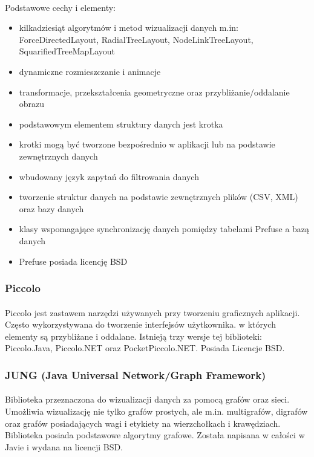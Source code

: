 \documentclass[a4paper,10pt]{article}
\begin{document}
\paragraph{}Podstawowe cechy i elementy:
\begin{itemize}
\item kilkadziesiąt algorytmów i metod wizualizacji danych m.in: ForceDirectedLayout, RadialTreeLayout, NodeLinkTreeLayout, SquarifiedTreeMapLayout
\item dynamiczne rozmieszczanie i animacje
\item transformacje, przekształcenia geometryczne oraz przybliżanie/oddalanie obrazu
\item podstawowym elementem struktury danych jest krotka
\item krotki mogą być tworzone bezpośrednio w aplikacji lub na podstawie zewnętrznych danych
\item wbudowany język zapytań do filtrowania danych
\item tworzenie struktur danych na podstawie zewnętrznych plików (CSV, XML) oraz bazy danych
\item klasy wspomagające synchronizację danych pomiędzy tabelami Prefuse a bazą danych
\item Prefuse posiada licencję BSD
\end{itemize}

\subsubsection{Piccolo}
\paragraph{} Piccolo jest zastawem narzędzi używanych przy tworzeniu graficznych aplikacji. Często wykorzystywana do tworzenie interfejsów użytkownika. w których elementy są przybliżane i oddalane. Istnieją trzy wersje tej biblioteki: Piccolo.Java, Piccolo.NET oraz PocketPiccolo.NET. Posiada Licencje BSD.

\subsubsection{JUNG (Java Universal Network/Graph Framework)}
\paragraph{} Biblioteka przeznaczona do wizualizacji danych za pomocą grafów oraz sieci. Umożliwia wizualizację nie tylko grafów prostych, ale m.in. multigrafów, digrafów oraz grafów posiadających wagi i etykiety na wierzchołkach i krawędziach. Biblioteka posiada podstawowe algorytmy grafowe. Została napisana w całości w Javie i wydana na licencji BSD.
\end{document}
